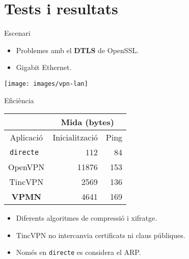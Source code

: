 \section{Tests i resultats}
    \begin{frame}{Escenari}
        \begin{itemize}
\item \alert{Problemes} amb el \textbf{DTLS} de OpenSSL.
        \end{itemize}
        \begin{itemize}
\item Gigabit Ethernet.
        \end{itemize}
        \vspace{2em}
        \begin{center}
        \texttt{[image: images/vpn-lan]}
        \end{center}
    \end{frame}
    \begin{frame}{Eficiència}
        \begin{center}
\begin{tabular}{|c|r|r|}
\multicolumn{1}{c}{} & \multicolumn{2}{|c|}{Mida (bytes)} \\ \hline
Aplicació & Inicialització & Ping \\ \hline \hline
\tt directe & 112 & 84 \\ \hline
OpenVPN & 11876 & 153 \\ \hline
TincVPN & 2569 & 136 \\ \hline
\bf VPMN & 4641 & 169 \\ \hline
\end{tabular}
        \end{center}
        \begin{itemize}
\item Diferents algoritmes de compressió i xifratge.
\item TincVPN no intercanvia certificats ni claus públiques.
\item Només en {\tt directe} es considera el ARP.
        \end{itemize}
    \end{frame}
